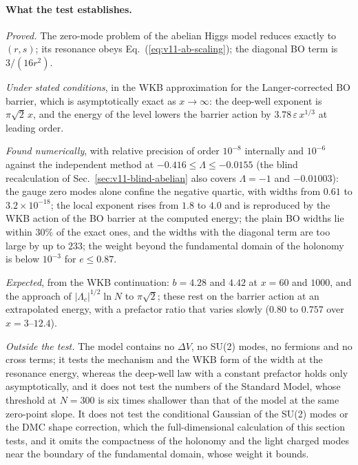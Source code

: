 \paragraph{What the test establishes.}
\emph{Proved.} The zero-mode problem of the abelian Higgs model reduces exactly to $(r,s)$; its resonance obeys Eq.~(\ref{eq:v11-ab-scaling}); the diagonal BO term is $3/(16r^2)$. %

\emph{Under stated conditions}, in the WKB approximation for the Langer-corrected BO barrier, which is asymptotically exact as $x\to\infty$: the deep-well exponent is $\pi\sqrt2\,x$, and the energy of the level lowers the barrier action by $3.78\,\varepsilon\,x^{1/3}$ at leading order. %

\emph{Found numerically}, with relative precision of order $10^{-8}$ internally and $10^{-6}$ against the independent method at $-0.416\le\Lambda\le-0.0155$ (the blind recalculation of Sec.~\ref{sec:v11-blind-abelian} also covers $\Lambda=-1$ and $-0.01003$): the gauge zero modes alone confine the negative quartic, with widths from $0.61$ to $3.2\times10^{-18}$; the local exponent rises from $1.8$ to $4.0$ and is reproduced by the WKB action of the BO barrier at the computed energy; the plain BO widths lie within $30\%$ of the exact ones, and the widths with the diagonal term are too large by up to $233$; the weight beyond the fundamental domain of the holonomy is below $10^{-3}$ for $e\le0.87$. %

\emph{Expected}, from the WKB continuation: $b=4.28$ and $4.42$ at $x=60$ and $1000$, and the approach of $|\Lambda_c|^{1/2}\ln N$ to $\pi\sqrt2$; these rest on the barrier action at an extrapolated energy, with a prefactor ratio that varies slowly ($0.80$ to $0.757$ over $x=3$--$12.4$). %

\emph{Outside the test.} The model contains no $\Delta V$, no SU(2) modes, no fermions and no cross terms; it tests the mechanism and the WKB form of the width at the resonance energy, whereas the deep-well law with a constant prefactor holds only asymptotically, and it does not test the numbers of the Standard Model, whose threshold at $N=300$ is six times shallower than that of the model at the same zero-point slope. %
It does not test the conditional Gaussian of the SU(2) modes or the DMC shape correction, which the full-dimensional calculation of this section tests, and it omits the compactness of the holonomy and the light charged modes near the boundary of the fundamental domain, whose weight it bounds.
